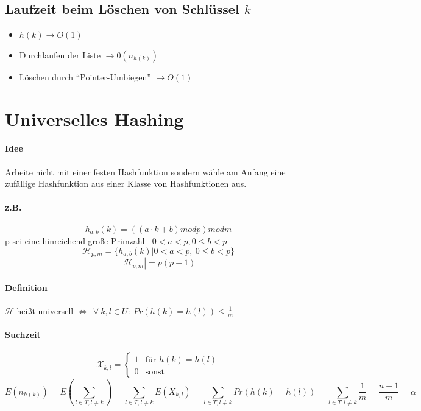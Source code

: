 \subsection{Laufzeit beim Löschen von Schlüssel $k$}
\begin{itemize}
	\item $h(k) \longrightarrow O(1)$
	\item Durchlaufen der Liste $\longrightarrow 0(n_{h(k)})$
	\item Löschen durch "`Pointer-Umbiegen"' $\longrightarrow O(1)$
\end{itemize}
\section{Universelles Hashing}
\paragraph*{Idee} Arbeite nicht mit einer festen Hashfunktion sondern wähle am Anfang eine zufällige Hashfunktion aus einer Klasse von Hashfunktionen aus.
\paragraph*{z.B.} \[ h_{a,b}(k)=((a\cdot k +b) mod p) mod m \]
p sei eine hinreichend große Primzahl$~~~~0<a<p, 0\leq b < p$
\[ \mathcal{H}_{p,m}=\{ h_{a,b}(k) | 0 < a < p, ~ 0 \leq b < p \} \]
\[ |\mathcal{H}_{p,m}| = p(p-1) \]
\paragraph*{Definition} $\mathcal{H}$ heißt universell $\Leftrightarrow~~\forall~k,l\in U:~ Pr(h(k)=h(l))\leq \frac{1}{m}$
\paragraph*{Suchzeit}
\[ \mathcal{X}_{k,l}=\begin{cases}1&\text{für }h(k)=h(l)\\0&\text{sonst}\end{cases} \]
\[ E(n_{h(k)})=E\left( \sum_{l \in T, l \neq k} \right) =  \sum_{l \in T, l \neq k} E(X_{k,l}) =  \sum_{l \in T, l \neq k} Pr(h(k)=h(l)) = \sum_{l \in T, l \neq k} \frac{1}{m} = \frac{n-1}{m} = \alpha \] 